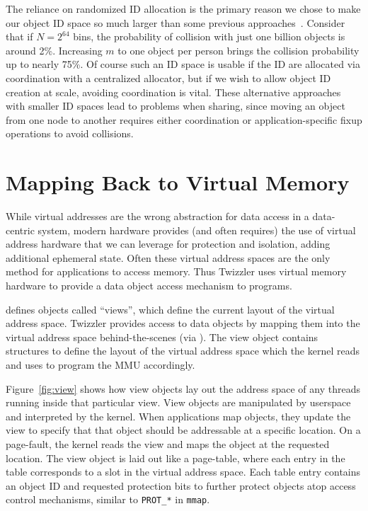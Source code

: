 The reliance on randomized ID allocation is the primary reason we chose to make our object ID space
so much larger than some previous approaches~\cite{pmdk,pmdk-pointers}. Consider that if $N = 2^{64}$
bins, the probability of collision with just one billion objects is around 2\%. Increasing $m$ to
one object per person brings the collision probability up to nearly 75\%. Of course such an ID space
is usable if the ID are allocated via coordination with a centralized allocator, but if
we wish to allow object ID creation at scale, avoiding coordination is vital. These alternative approaches with smaller ID spaces lead to problems when
sharing, since moving an object from one node to another requires either coordination or application-specific fixup
operations to avoid collisions.

\section{Mapping Back to Virtual Memory}


\label{sec:view}


While virtual addresses are the wrong abstraction
for data access in a data-centric system, modern hardware provides (and often requires) the use of virtual address
hardware that we can leverage for protection and isolation, adding additional ephemeral state. Often these virtual
address spaces are the only method for applications to access memory. Thus Twizzler uses virtual memory hardware to
provide a data object access mechanism to programs.

\Twizzler defines objects called ``views'', which define the current
layout of the virtual address space. Twizzler
provides access to data objects by mapping them into the virtual address space
behind-the-scenes (via \libcore). The view object contains structures to define the layout of the
virtual address space which the kernel reads and uses to program the MMU accordingly.

Figure~\ref{fig:view} shows how view objects lay out the address space of any threads running inside
that particular view. View objects are manipulated by userspace and interpreted by the kernel. When
applications map objects, they update the view to specify that that object should be addressable at
a specific location. On a page-fault, the kernel reads the view and maps the object at the requested
location. The view object is laid out like a page-table, where each entry in the table corresponds
to a slot in the virtual address space. Each table entry contains an object ID and requested
protection bits to further protect objects atop access control mechanisms, similar to
\texttt{PROT\_*} in \texttt{mmap}.

